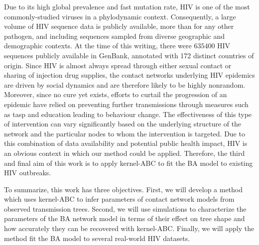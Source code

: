 Due to its high global prevalence and fast mutation rate, \gls{HIV} is one of
the most commonly-studied viruses in a phylodynamic context. Consequently, a
large volume of \gls{HIV} sequence data is publicly available, more than for
any other pathogen, and including sequences sampled from diverse geographic and
demographic contexts. At the time of this writing, there were $635400$ HIV
sequences publicly available in GenBank, annotated with 172 distinct countries
of origin. Since \gls{HIV} is almost always spread through either sexual
contact or sharing of injection drug supplies, the contact networks underlying
\gls{HIV} epidemics are driven by social dynamics and are therefore likely to
be highly nonrandom. Moreover, since no cure yet exists, efforts to curtail the
progression of an epidemic have relied on preventing further transmissions
through measures such as \gls{tasp} and education leading to behaviour change.
The effectiveness of this type of intervention can vary significantly based on
the underlying structure of the network and the particular nodes to whom the
intervention is targeted. Due to this combination of data availability and
potential public health impact, \gls{HIV} is an obvious context in which our
method could be applied. Therefore, the third and final aim of this work is to
apply kernel-\gls{ABC} to fit the \gls{BA} model to existing \gls{HIV}
outbreaks.

To summarize, this work has three objectives. First, we will develop a method
which uses kernel-\gls{ABC} to infer parameters of contact network models from
observed transmission trees. Second, we will use simulations to characterize
the parameters of the \gls{BA} network model in terms of their effect on tree
shape and how accurately they can be recovered with kernel-\gls{ABC}. Finally,
we will apply the method fit the \gls{BA} model to several real-world \gls{HIV}
datasets.

